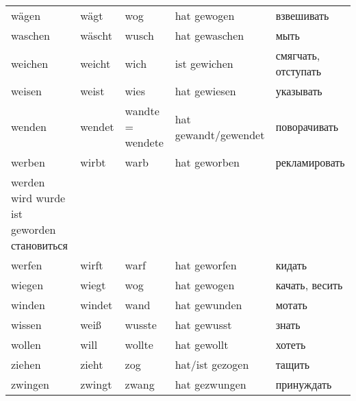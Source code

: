 \begin{longtable}{|l|l|l|l|l|}
w\"agen & w\"agt & wog & hat gewogen & взвешивать \\
waschen & w\"ascht & wusch & hat gewaschen & мыть \\
weichen & weicht & wich & ist gewichen & смягчать, отступать \\
weisen & weist & wies & hat gewiesen & указывать \\
wenden & wendet & wandte = wendete & hat gewandt/gewendet & поворачивать \\
werben & wirbt & warb & hat geworben & рекламировать \\
werden	wird	wurde	ist geworden	становиться \\
werfen & wirft & warf & hat geworfen & кидать \\
wiegen & wiegt & wog & hat gewogen & качать, весить \\
winden & windet & wand & hat gewunden & мотать \\
wissen & wei\ss  & wusste & hat gewusst & знать \\
wollen & will & wollte & hat gewollt & хотеть \\
ziehen & zieht & zog & hat/ist gezogen & тащить \\
zwingen & zwingt & zwang & hat gezwungen & принуждать \\
\hline
\end{longtable}
